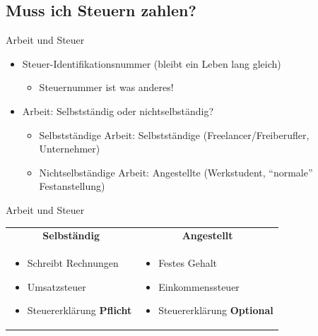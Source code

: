 \documentclass{beamer}
\begin{document}
		\begin{frame}
		\end{frame}
	
		\subsection{Muss ich Steuern zahlen?}
		
			\begin{frame}{Arbeit und Steuer}
				\begin{itemize}
					\item Steuer-Identifikationsnummer (bleibt ein Leben lang gleich)
					\begin{itemize}
						\item Steuernummer ist was anderes!
					\end{itemize}
					\item Arbeit: Selbstständig oder nichtselbständig?
					\begin{itemize}
						\item Selbstständige Arbeit: Selbstständige (Freelancer/Freiberufler, Unternehmer)
						\item Nichtselbständige Arbeit: Angestellte (Werkstudent, "`normale"' Festanstellung)
					\end{itemize}
				\end{itemize}
			\end{frame}
		
			\begin{frame}{Arbeit und Steuer}
				\begin{tabularx}{\linewidth}{X|X}
					\multicolumn{1}{c|}{\textbf{Selbständig}} &
					\multicolumn{1}{c}{\textbf{Angestellt}} \\[0.25cm]
					\begin{itemize}
						\item Schreibt Rechnungen
						\item Umsatzsteuer
						\item Steuererklärung \textbf{Pflicht}
					\end{itemize} &
					\begin{itemize}
						\item Festes Gehalt
						\item Einkommenssteuer
						\item Steuererklärung \textbf{Optional}
					\end{itemize}
				\end{tabularx}
			\end{frame}
		
\end{document}
